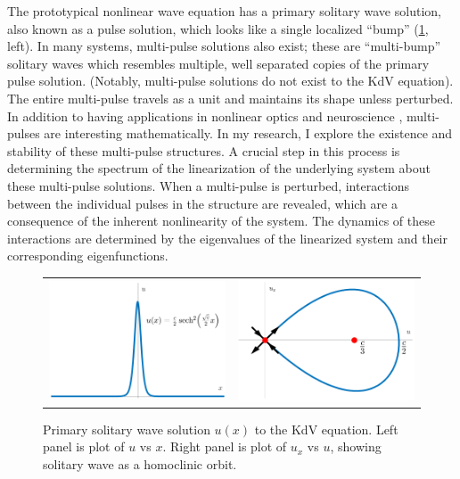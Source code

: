 \documentclass[12pt,reqno,oneside,hidelinks]{article}
\begin{document}
The prototypical nonlinear wave equation has a primary solitary wave solution, also known as a pulse solution, which looks like a single localized ``bump'' (\cref{fig:kdvpp}, left). In many systems, multi-pulse solutions also exist; these are ``multi-bump'' solitary waves which resembles multiple, well separated copies of the primary pulse solution. (Notably, multi-pulse solutions do not exist to the KdV equation). 
The entire multi-pulse travels as a unit and maintains its shape unless perturbed. In addition to having applications in nonlinear optics and neuroscience \cite{Evans1982}, multi-pulses are interesting mathematically. In my research, I explore the existence and stability of these multi-pulse structures. A crucial step in this process is determining the spectrum of the linearization of the underlying system about these multi-pulse solutions. When a multi-pulse is perturbed, interactions between the individual pulses in the structure are revealed, which are a consequence of the inherent nonlinearity of the system. The dynamics of these interactions are determined by the eigenvalues of the linearized system and their corresponding eigenfunctions.

\begin{figure}[H]
    \centering
    \begin{tabular}{cc}
        \includegraphics[width=6cm]{images/KdVsolitoneq.png} &
        \includegraphics[width=6cm]{images/KdVphaseportait.png} 
    \end{tabular}
    \caption{Primary solitary wave solution $u(x)$ to the KdV equation. Left panel is plot of $u$ vs $x$. Right panel is plot of $u_x$ vs $u$, showing solitary wave as a homoclinic orbit. }
    \label{fig:kdvpp}
\end{figure}
\end{document}
